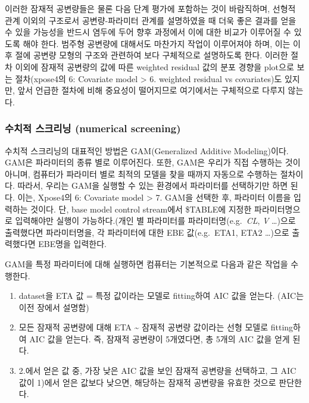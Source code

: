 \documentclass[
  10pt,
  krantz2,
  a4paper]{krantz}
\providecommand{\tightlist}{%
  \setlength{\itemsep}{0pt}\setlength{\parskip}{0pt}}
\theoremstyle{definition}
\theoremstyle{definition}
\theoremstyle{definition}
\theoremstyle{remark}
\begin{document}
이러한 잠재적 공변량들은 물론 다음 단계 평가에 포함하는 것이 바람직하며, 선형적 관계 이외의 구조로서 공변량-파라미터 관계를 설명하였을 때 더욱 좋은 결과를 얻을 수 있을 가능성을 반드시 염두에 두어 향후 과정에서 이에 대한 비교가 이루어질 수 있도록 해야 한다. 범주형 공변량에 대해서도 마찬가지 작업이 이루어져야 하며, 이는 이후 절에 공변량 모형의 구조와 관련하여 보다 구체적으로 설명하도록 한다. 이러한 절차 이외에 잠재적 공변량의 값에 따른 weighted residual 값의 분포 경향을 plot으로 보는 절차(xpose4의 6: Covariate model \textgreater{} 6. weighted residual vs covariates)도 있지만, 앞서 언급한 절차에 비해 중요성이 떨어지므로 여기에서는 구체적으로 다루지 않는다.

\hypertarget{uxc218uxce58uxc801-uxc2a4uxd06cuxb9acuxb2dd-numerical-screening}{%
\subsubsection{수치적 스크리닝 (numerical screening)}\label{uxc218uxce58uxc801-uxc2a4uxd06cuxb9acuxb2dd-numerical-screening}}


수치적 스크리닝의 대표적인 방법은 GAM(Generalized Additive Modeling)이다. GAM은 파라미터의 종류 별로 이루어진다. 또한, GAM은 우리가 직접 수행하는 것이 아니며, 컴퓨터가 파라미터 별로 최적의 모델을 찾을 때까지 자동으로 수행하는 절차이다. 따라서, 우리는 GAM을 실행할 수 있는 환경에서 파라미터를 선택하기만 하면 된다. 이는, Xpose4의 6: Covariate model \textgreater{} 7. GAM을 선택한 후, 파라미터 이름을 입력하는 것이다. 단, base model control stream에서 \$TABLE에 지정한 파라미터명으로 입력해야만 실행이 가능하다.(개인 별 파라미터를 파라미터명(e.g.~\emph{CL}, \emph{V} \ldots)으로 출력했다면 파라미터명을, 각 파라미터에 대한 EBE 값(e.g.~ETA1, ETA2 \ldots)으로 출력했다면 EBE명을 입력한다.

GAM을 특정 파라미터에 대해 실행하면 컴퓨터는 기본적으로 다음과 같은 작업을 수행한다.

\begin{enumerate}
\def\labelenumi{\arabic{enumi}.}
\tightlist
\item
  dataset을 ETA 값 = 특정 값이라는 모델로 fitting하여 AIC 값을 얻는다. (AIC는 이전 장에서 설명함)
\item
  모든 잠재적 공변량에 대해 ETA \textasciitilde{} 잠재적 공변량 값이라는 선형 모델로 fitting하여 AIC 값을 얻는다. 즉, 잠재적 공변량이 5개였다면, 총 5개의 AIC 값을 얻게 된다.
\item
  2.에서 얻은 값 중, 가장 낮은 AIC 값을 보인 잠재적 공변량을 선택하고, 그 AIC 값이 1)에서 얻은 값보다 낮으면, 해당하는 잠재적 공변량을 유효한 것으로 판단한다.
\end{enumerate}
\end{document}
